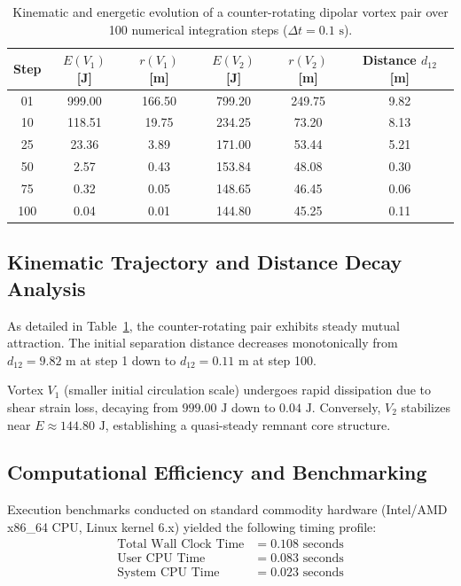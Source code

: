 \documentclass[11pt, a4paper]{article}
\begin{document}
\begin{table}[htbp]
\centering
\caption{Kinematic and energetic evolution of a counter-rotating dipolar vortex pair over 100 numerical integration steps ($\Delta t = 0.1\text{ s}$).}
\label{tab:dipolar_results}
\vspace{0.2cm}
\begin{tabular}{cccccc}
\toprule
\textbf{Step} & \textbf{$E(V_1)$ [J]} & \textbf{$r(V_1)$ [m]} & \textbf{$E(V_2)$ [J]} & \textbf{$r(V_2)$ [m]} & \textbf{Distance $d_{12}$ [m]} \\
\midrule
01  & 999.00 & 166.50 & 799.20 & 249.75 & 9.82 \\
10  & 118.51 & 19.75  & 234.25 & 73.20  & 8.13 \\
25  & 23.36  & 3.89   & 171.00 & 53.44  & 5.21 \\
50  & 2.57   & 0.43   & 153.84 & 48.08  & 0.30 \\
75  & 0.32   & 0.05   & 148.65 & 46.45  & 0.06 \\
100 & 0.04   & 0.01   & 144.80 & 45.25  & 0.11 \\
\bottomrule
\end{tabular}
\end{table}

\subsection{Kinematic Trajectory and Distance Decay Analysis}

As detailed in Table~\ref{tab:dipolar_results}, the counter-rotating pair exhibits steady mutual attraction. The initial separation distance decreases monotonically from $d_{12} = 9.82\text{ m}$ at step 1 down to $d_{12} = 0.11\text{ m}$ at step 100.

Vortex $V_1$ (smaller initial circulation scale) undergoes rapid dissipation due to shear strain loss, decaying from $999.00\text{ J}$ down to $0.04\text{ J}$. Conversely, $V_2$ stabilizes near $E \approx 144.80\text{ J}$, establishing a quasi-steady remnant core structure.

\subsection{Computational Efficiency and Benchmarking}

Execution benchmarks conducted on standard commodity hardware (Intel/AMD x86\_64 CPU, Linux kernel 6.x) yielded the following timing profile:
\begin{align*}
\text{Total Wall Clock Time} &= 0.108\text{ seconds} \\
\text{User CPU Time} &= 0.083\text{ seconds} \\
\text{System CPU Time} &= 0.023\text{ seconds}
\end{align*}
\end{document}
